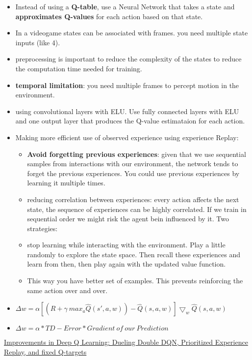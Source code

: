 \begin{itemize}[noitemsep,nolistsep]
	\item Instead of using a \textbf{Q-table}, use a Neural Network that takes a state and \textbf{approximates Q-values} for each action based on that state.
	\item In a videogame states can be associated with frames. you need multiple state inputs (like 4).
	\item preprocessing is important to reduce the complexity of the states to reduce the computation time needed for training.
	\item \textbf{temporal limitation}: you need multiple frames to percept motion in the environment.
	\item using convolutional layers with ELU. Use fully connected layers with ELU and one output layer that produces the Q-value estimataion for each action.
	\item Making more efficient use of observed experience using experience Replay:
	\begin{itemize}[noitemsep,nolistsep]
		\item \textbf{Avoid forgetting previous experiences}: given that we use sequential samples from interactions with our environment, the network tends to forget the previous experiences. You could use previous experiences by learning it multiple times.
		\item reducing correlation between experiences: every action affects the next state, the sequence of experiences can be highly correlated. If we train in sequential order we might risk the agent bein influenced by it. Two strategies:
		\item stop learning while interacting with the environment. Play a little randomly to explore the state space. Then recall these experiences and learn from then, then play again with the updated value function.
		\item This way you have better set of examples. This prevents reinforcing the same action over and over.
	\end{itemize} 
	\item $\Delta w = \alpha [(R + \gamma\ max_a \hat{Q}(s',a,w)) - \hat{Q}(s,a,w)]\bigtriangledown_w \hat{Q}(s,a,w)$ 
	\item $\Delta w = \alpha * TD-Error * Gradient\ of\ our\ Prediction$
\end{itemize} 
\href{https://www.freecodecamp.org/news/improvements-in-deep-q-learning-dueling-double-dqn-prioritized-experience-replay-and-fixed-58b130cc5682/}{Improvements in Deep Q Learning: Dueling Double DQN, Prioritized Experience Replay, and fixed Q-targets}
